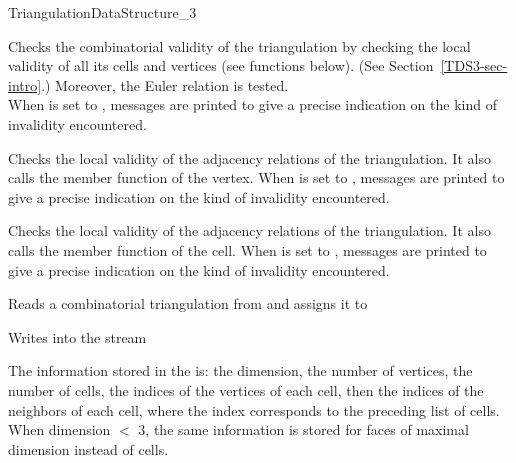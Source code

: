 \begin{ccRefConcept}{TriangulationDataStructure_3}
\begin{ccAdvanced}
{Checks the combinatorial validity of the triangulation by checking
the local validity of all its cells and vertices (see functions below). 
(See Section~\ref{TDS3-sec-intro}.) Moreover, the Euler relation is
tested.\\
When  is set to , messages are printed to give
a precise indication on the kind of invalidity encountered.}

{Checks the local validity of the adjacency relations of the triangulation.
It also calls the  member function of the vertex.
When  is set to , messages are printed to give
a precise indication on the kind of invalidity encountered.}

{Checks the local validity of the adjacency relations of the triangulation.
It also calls the  member function of the cell.
When  is set to , messages are printed to give
a precise indication on the kind of invalidity encountered.}

\end{ccAdvanced}


{Reads a combinatorial triangulation from  and assigns it to }

{Writes  into the stream }

The information stored in the  is: 
the dimension, the number of vertices, the number of cells,
the indices of the vertices of each cell, then the indices of the
neighbors of each cell, where the index corresponds to the preceding
list of cells. When dimension $<$ 3, the same information is stored
for faces of maximal dimension instead of cells.

\ccHasModels


\ccSeeAlso

\\

\end{ccRefConcept}
